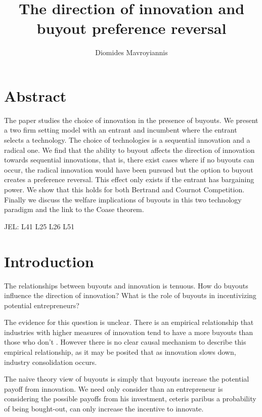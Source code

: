 \documentclass[11pt]{article}
\begin{document}
\title{The direction of innovation and buyout preference reversal}
\author{Diomides Mavroyiannis}

\maketitle

\section*{Abstract}
The paper studies the choice of innovation in the presence of buyouts. We present a two firm setting model with an entrant and incumbent where the entrant selects a technology. The choice of technologies is a sequential innovation and a radical one. We find that the ability to buyout affects the direction of innovation towards sequential innovations, that is, there exist cases where if no buyouts can occur, the radical innovation would have been pursued but the option to buyout creates a preference reversal. This effect only exists if the entrant has bargaining power. We show that this holds for both Bertrand and Cournot Competition. Finally we discuss the welfare implications of buyouts in this two technology paradigm and the link to the Coase theorem. 


JEL: L41 L25 L26 L51 	

\section{Introduction}


The relationships between buyouts and innovation is tenuous. How do buyouts influence the direction of innovation? What is the role of buyouts in incentivizing potential entrepreneurs? 


The evidence for this question is unclear. There is an empirical relationship that industries with higher measures of innovation tend to have a more buyouts than those who don't \citep{HAU}. However there is no clear causal mechanism to describe this empirical relationship, as it may be posited that as innovation slows down, industry consolidation occurs. \citep{COM}


The naive theory view of buyouts is simply that buyouts increase the potential payoff from innovation. We need only consider than an entrepreneur is considering the possible payoffs from his investment, ceteris paribus a probability of being bought-out, can only increase the incentive to innovate. 
\end{document}
